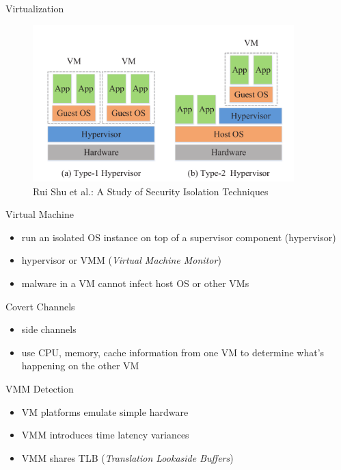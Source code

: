 \documentclass{curs}
\begin{document}
\begin{frame}{Virtualization}
  \begin{figure}
    \centering
    \includegraphics[width=0.9\textwidth]{img/virtualization} \\
    {\tiny Rui Shu et al.: A Study of Security Isolation Techniques}
  \end{figure}
\end{frame}

\begin{frame}{Virtual Machine}
  \begin{itemize}
    \item run an isolated OS instance on top of a supervisor component (hypervisor)
    \item hypervisor or VMM (\textit{Virtual Machine Monitor})
    \item malware in a VM cannot infect host OS or other VMs
  \end{itemize}
\end{frame}

\begin{frame}{Covert Channels}
  \begin{itemize}
    \item side channels
    \item use CPU, memory, cache information from one VM to determine what's happening on the other VM
  \end{itemize}
\end{frame}

\begin{frame}{VMM Detection}
  \begin{itemize}
    \item VM platforms emulate simple hardware
    \item VMM introduces time latency variances
    \item VMM shares TLB (\textit{Translation Lookaside Buffers})
  \end{itemize}
\end{frame}
\end{document}
